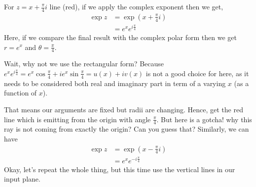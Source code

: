 For $z=x+\frac{\pi}{4}i$ line (red), if we apply the complex exponent then we get,
\begin{align*}
    \exp{z}&=\exp\left({x+\frac{\pi}{4}i}\right)\\
    &= e^{x}e^{i\frac{\pi}{4}}
\end{align*}
Here, if we compare the final result with the complex polar form then we get $r=e^x$ and $\theta=\frac{\pi}{4}$. 
\begin{tcolorbox}
Wait, why not we use the rectangular form? Because $e^xe^{i\frac{\pi}{4}}=e^x\cos\frac{\pi}{4}+ie^x\sin\frac{\pi}{4}=u(x)+iv(x)$ is not a good choice for here, as it needs to be considered both real and imaginary part in term of a varying $x$ (as a function of $x$).    
\end{tcolorbox}
 That means our arguments are fixed but radii are changing. Hence, get the red line which is emitting from the origin with angle $\frac{\pi}{4}$. But here is a gotcha! why this ray is not coming from exactly the origin? Can you guess that? Similarly, we can have
\begin{align*}
    \exp{z}&=\exp\left({x-\frac{\pi}{4}i}\right)\\
    &= e^{x}e^{-i\frac{\pi}{4}}
\end{align*}
Okay, let's repeat the whole thing, but this time use the vertical lines in our input plane. 

